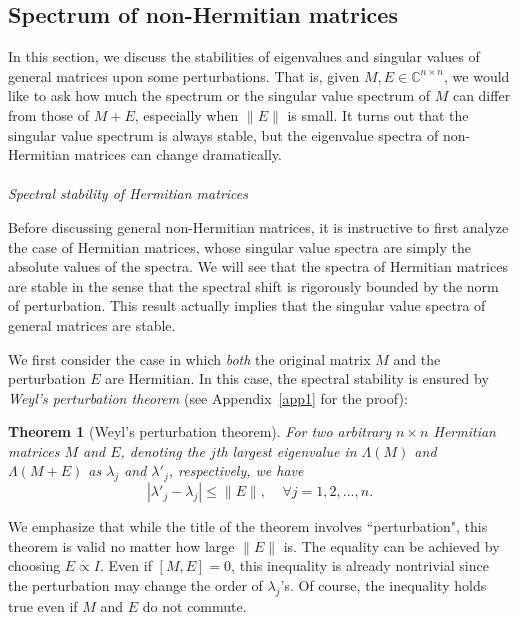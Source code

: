 \documentclass{tADP2e}
\theoremstyle{plain}
\theoremstyle{plain}
\newtheorem{theorem}{Theorem}[section]
\theoremstyle{definition}
\begin{document}
\subsection{Spectrum of non-Hermitian matrices\label{secspecnh}}
In this section, we discuss the stabilities of eigenvalues and singular values of general matrices upon some perturbations. That is, given $M,E\in\mathbb{C}^{n\times n}$, we would like to ask how much the spectrum or the singular value spectrum of $M$ can differ from those of $M+E$, especially when $\|E\|$ is small. It turns out that the singular value spectrum is always stable, but the eigenvalue spectra of non-Hermitian matrices can change dramatically.
\\
\\
{\it Spectral stability of Hermitian matrices}

\vspace{3pt}
\noindent
Before discussing general non-Hermitian matrices, it is instructive to first analyze the case of Hermitian matrices, whose singular value spectra are simply the absolute values of the spectra. We will see that the spectra of Hermitian matrices are stable in the sense that the spectral shift is rigorously bounded by the norm of perturbation. This result actually implies that the singular value spectra of general matrices are stable.

We first consider the case in which \emph{both}  the original matrix $M$ and the perturbation $E$ are Hermitian. In this case, the spectral stability is ensured by  \emph{Weyl's perturbation theorem}  \cite{RB97} (see Appendix~\ref{app1} for the proof): 
\begin{theorem}[Weyl's perturbation theorem]
For two arbitrary $n\times n$ Hermitian matrices $M$ and $E$, denoting the $j$th largest eigenvalue in $\Lambda(M)$ and $\Lambda(M+E)$ as $\lambda_j$ and $\lambda'_j$, respectively, we have
\begin{equation}
|\lambda'_j-\lambda_j|\le \|E\|,\;\;\;\;\forall j=1,2,...,n.
\label{Weylpert}
\end{equation}
\end{theorem}
We emphasize that while the title of the theorem involves ``perturbation", this theorem is valid no matter how large $\|E\|$ is. The equality can be achieved by choosing $E\propto I$. Even if $[M,E]=0$, this inequality is already nontrivial since the perturbation may change the order of $\lambda_j$'s. Of course, the inequality holds true even if $M$ and $E$ do not commute. 
\end{document}
